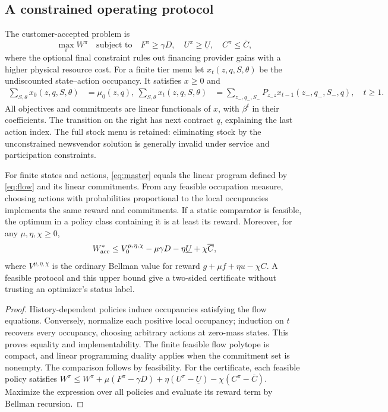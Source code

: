 \subsection{A constrained operating protocol}
The customer-accepted problem is
\begin{equation}\label{eq:master}
 \max_\pi W^\pi\quad\text{subject to}\quad
 F^\pi\geq\gamma D,\quad U^\pi\geq\underline U,
 \quad C^\pi\leq\overline C,
\end{equation}
where the optional final constraint rules out financing provider gains with a higher physical resource cost. For a finite tier menu let $x_t(z,q,S,\theta)$ be the undiscounted state--action occupancy. It satisfies $x\geq0$ and
\begin{align}
 \sum_{S,\theta}x_0(z,q,S,\theta)&=\mu_0(z,q),\
 \sum_{S,\theta}x_t(z,q,S,\theta)&=
 \sum_{z_-,q_-,S_-}P_{z_-z}x_{t-1}(z_-,q_-,S_-,q),\quad t\geq1.\label{eq:flow}
\end{align}
All objectives and commitments are linear functionals of $x$, with $\beta^t$ in their coefficients. The transition on the right has next contract $q$, explaining the last action index. The full stock menu is retained: eliminating stock by the unconstrained newsvendor solution is generally invalid under service and participation constraints.
\begin{theorem}[Acceptance, Pareto comparison, and a certificate]\label{thm:accepted}
For finite states and actions, \eqref{eq:master} equals the linear program defined by \eqref{eq:flow} and its linear commitments. From any feasible occupation measure, choosing actions with probabilities proportional to the local occupancies implements the same reward and commitments. If a static comparator is feasible, the optimum in a policy class containing it is at least its reward. Moreover, for any $\mu,\eta,\chi\geq0$,
\begin{equation}\label{eq:dual}
 W^*_{\rm acc}\leq V^{\mu,\eta,\chi}_0
           -\mu\gamma D-\eta\underline U+\chi\overline C,
\end{equation}
where $V^{\mu,\eta,\chi}$ is the ordinary Bellman value for reward
$g+\mu f+\eta u-\chi C$. A feasible protocol and this upper bound give a two-sided certificate without trusting an optimizer's status label.
\end{theorem}
\begin{proof}
History-dependent policies induce occupancies satisfying the flow equations. Conversely, normalize each positive local occupancy; induction on $t$ recovers every occupancy, choosing arbitrary actions at zero-mass states. This proves equality and implementability. The finite feasible flow polytope is compact, and linear programming duality applies when the commitment set is nonempty. The comparison follows by feasibility. For the certificate, each feasible policy satisfies
$W^\pi\leq W^\pi+\mu(F^\pi-\gamma D)+\eta(U^\pi-\underline U)-\chi(C^\pi-\overline C)$.
Maximize the expression over all policies and evaluate its reward term by Bellman recursion.\end{proof}
